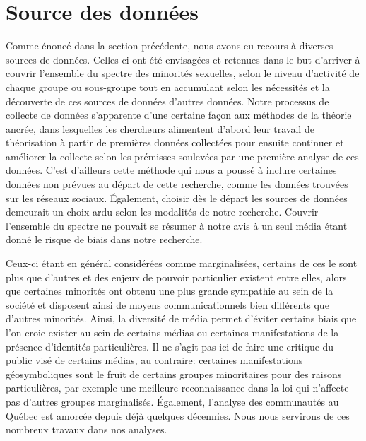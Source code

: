 \section{Source des données}
\label{sec:source_des_donn_es}
Comme énoncé dans la section précédente, nous avons eu recours à diverses sources de données. 
Celles-ci ont été envisagées et retenues dans le but d'arriver à couvrir l'ensemble du spectre des minorités sexuelles, selon le niveau d'activité de chaque groupe ou sous-groupe tout en accumulant selon les nécessités et la découverte de ces sources de données d'autres données. 
Notre processus de collecte de données s'apparente d'une certaine façon aux méthodes de la théorie ancrée, dans lesquelles les chercheurs alimentent d'abord leur travail de théorisation à partir de premières données collectées pour ensuite continuer et améliorer la collecte selon les prémisses soulevées par une première analyse de ces données. 
C'est d'ailleurs cette méthode qui nous a poussé à inclure certaines données non prévues au départ de cette recherche, comme les données trouvées sur les réseaux sociaux. 
Également, choisir dès le départ les sources de données demeurait un choix ardu selon les modalités de notre recherche. 
Couvrir l'ensemble du spectre \lgbt{} ne pouvait se résumer à notre avis à un seul média étant donné le risque de biais dans notre recherche.

Ceux-ci étant en général considérées comme marginalisées, certains de ces le sont plus que d'autres et des enjeux de pouvoir particulier existent entre elles, alors que certaines minorités ont obtenu une plus grande sympathie au sein de la société et disposent ainsi de moyens communicationnels bien différents que d'autres minorités. 
Ainsi, la diversité de média permet d'éviter certains biais que l'on croie exister au sein de certains médias ou certaines manifestations de la présence d'identités particulières. 
Il ne s'agit pas ici de faire une critique du public visé de certains médias, au contraire: certaines manifestations géosymboliques sont le fruit de certains groupes minoritaires pour des raisons particulières, par exemple une meilleure reconnaissance dans la loi qui n'affecte pas d'autres groupes marginalisés. 
Également, l'analyse des communautés \lgbt{} au Québec est amorcée depuis déjà quelques décennies. 
Nous nous servirons de ces nombreux travaux dans nos analyses.

